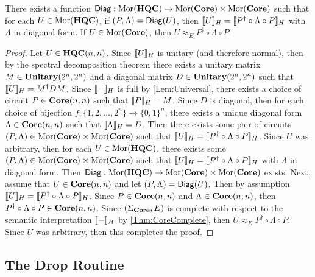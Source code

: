 \begin{theorem}
    \label{Thm:Diag}
    There exists a function $\mathsf{Diag}: \operatorname{Mor}( \mathbf{HQC} ) \to \operatorname{Mor}( \mathbf{Core} ) \times \operatorname{Mor}( \mathbf{Core} )$ such that for each $U \in \operatorname{Mor}( \mathbf{HQC} )$, if $( P, \Lambda ) = \mathsf{Diag}( U )$, then $\llbracket U\rrbracket_H = \llbracket P^\dagger \circ \Lambda \circ P\rrbracket_H$ with $\Lambda$ in diagonal form.
    If $U \in \operatorname{Mor}( \mathbf{Core} )$, then $U \approx_E P^\dagger \circ \Lambda \circ P$.
\end{theorem}

\begin{proof}
    Let $U \in \mathbf{HQC}( n, n )$.
    Since $\llbracket U\rrbracket_H$ is unitary (and therefore normal), then by the spectral decomposition theorem there exists a unitary matrix $M \in \mathbf{Unitary}( 2^n, 2^n )$ and a diagonal matrix $D \in \mathbf{Unitary}( 2^n, 2^n )$ such that $\llbracket U\rrbracket_H = M^\dagger D M$.
    Since $\llbracket-\rrbracket_H$ is full by \cref{Lem:Universal}, there exists a choice of circuit $P \in \mathbf{Core}( n, n )$ such that $\llbracket P\rrbracket_H = M$.
    Since $D$ is diagonal, then for each choice of bijection $f: \{ 1, 2, \ldots, 2^n \} \to \{ 0, 1 \}^n$, there exists a unique diagonal form $\Lambda \in \mathbf{Core}( n, n )$ such that $\llbracket\Lambda\rrbracket_H = D$.
    Then there exists some pair of circuits $( P, \Lambda ) \in \operatorname{Mor}( \mathbf{Core} ) \times \operatorname{Mor}( \mathbf{Core} )$ such that $\llbracket U\rrbracket_H = \llbracket P^\dagger \circ \Lambda \circ P\rrbracket_H$.
    Since $U$ was arbitrary, then for each $U \in \operatorname{Mor}( \mathbf{HQC} )$, there exists some $( P, \Lambda ) \in \operatorname{Mor}( \mathbf{Core} ) \times \operatorname{Mor}( \mathbf{Core})$ such that $\llbracket U\rrbracket_H = \llbracket P^\dagger \circ \Lambda \circ P\rrbracket_H$ with $\Lambda$ in diagonal form.
    Then $\mathsf{Diag}: \operatorname{Mor}( \mathbf{HQC} ) \to \operatorname{Mor}( \mathbf{Core} ) \times \operatorname{Mor}( \mathbf{Core} )$ exists.
    Next, assume that $U \in \mathbf{Core}( n, n )$ and let $( P, \Lambda ) = \mathsf{Diag}( U )$.
    Then by assumption $\llbracket U\rrbracket_H = \llbracket P^\dagger \circ \Lambda \circ P\rrbracket_H$.
    Since $P \in \mathbf{Core}( n, n )$ and $\Lambda \in \mathbf{Core}( n, n )$, then $P^\dagger \circ \Lambda \circ P \in \mathbf{Core}( n, n )$.
    Since $( \Sigma_{\mathbf{Core}}, E )$ is complete with respect to the semantic interpretation $\llbracket-\rrbracket_H$ by \cref{Thm:CoreComplete}, then $U \approx_E P^\dagger \circ \Lambda \circ P$.
    Since $U$ was arbitrary, then this completes the proof.
\end{proof}

\subsection{The Drop Routine}




